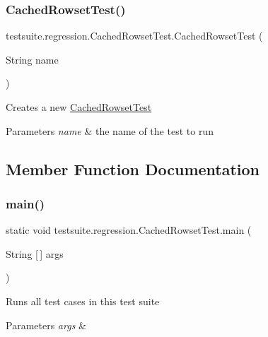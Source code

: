 \subsubsection{\texorpdfstring{Cached\+Rowset\+Test()}{CachedRowsetTest()}}
{\footnotesize\ttfamily testsuite.\+regression.\+Cached\+Rowset\+Test.\+Cached\+Rowset\+Test (\begin{DoxyParamCaption}\item[{String}]{name }\end{DoxyParamCaption})}

Creates a new \mbox{\hyperlink{classtestsuite_1_1regression_1_1_cached_rowset_test}{Cached\+Rowset\+Test}}


\begin{DoxyParams}{Parameters}
{\em name} & the name of the test to run \\
\hline
\end{DoxyParams}


\subsection{Member Function Documentation}
\mbox{\label{classtestsuite_1_1regression_1_1_cached_rowset_test_a66de4a98e7241932f80981d0efa979be}} 
\subsubsection{\texorpdfstring{main()}{main()}}
{\footnotesize\ttfamily static void testsuite.\+regression.\+Cached\+Rowset\+Test.\+main (\begin{DoxyParamCaption}\item[{String \mbox{[}$\,$\mbox{]}}]{args }\end{DoxyParamCaption})\hspace{0.3cm}{\ttfamily [static]}}

Runs all test cases in this test suite


\begin{DoxyParams}{Parameters}
{\em args} & \\
\hline
\end{DoxyParams}
\mbox{\label{classtestsuite_1_1regression_1_1_cached_rowset_test_a463f914f431e564bd1e4fe42de779037}} 
